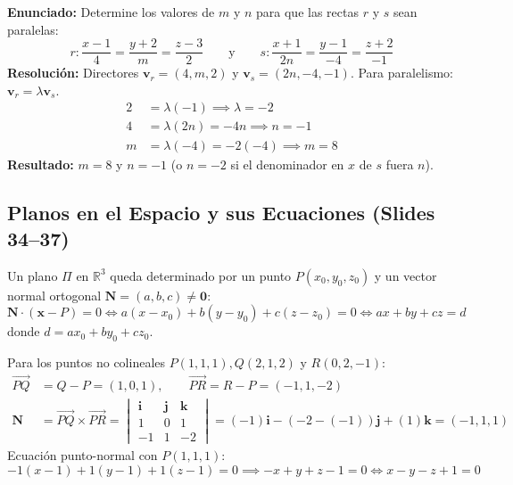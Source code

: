 \documentclass[10pt,letterpaper]{article}
\newcommand{\iu}{\mathbf{i}}
\newcommand{\ju}{\mathbf{j}}
\newcommand{\ku}{\mathbf{k}}
\newcommand{\vv}{\mathbf{v}}
\newcommand{\vn}{\mathbf{N}}
\begin{document}
\begin{cajaEjemplo}
\textbf{Enunciado:} Determine los valores de $m$ y $n$ para que las rectas $r$ y $s$ sean paralelas:
\[
r: \frac{x - 1}{4} = \frac{y + 2}{m} = \frac{z - 3}{2} \qquad \text{y} \qquad s: \frac{x + 1}{2n} = \frac{y - 1}{-4} = \frac{z + 2}{-1}
\]
\textbf{Resolución:} Directores $\vv_r = (4, m, 2)$ y $\vv_s = (2n, -4, -1)$.
Para paralelismo: $\vv_r = \lambda\vv_s$.
\begin{align*}
2 &= \lambda(-1) \implies \lambda = -2 \\
4 &= \lambda(2n) = -4n \implies n = -1 \\
m &= \lambda(-4) = -2(-4) \implies m = 8
\end{align*}
\textbf{Resultado:} $m = 8$ y $n = -1$ (o $n = -2$ si el denominador en $x$ de $s$ fuera $n$).
\end{cajaEjemplo}

\subsection{Planos en el Espacio y sus Ecuaciones (Slides 34--37)}
Un plano $\Pi$ en $\mathbb{R}^3$ queda determinado por un punto $P(x_0, y_0, z_0)$ y un vector normal ortogonal $\vn = (a, b, c) \neq \mathbf{0}$:
\[
\vn \cdot (\mathbf{x} - P) = 0 \iff a(x - x_0) + b(y - y_0) + c(z - z_0) = 0 \iff ax + by + cz = d
\]
donde $d = ax_0 + by_0 + cz_0$.

\begin{cajaEjemplo}
Para los puntos no colineales $P(1, 1, 1), Q(2, 1, 2)$ y $R(0, 2, -1)$:
\begin{align*}
\overrightarrow{PQ} &= Q - P = (1, 0, 1), \qquad \overrightarrow{PR} = R - P = (-1, 1, -2) \\
\vn &= \overrightarrow{PQ} \times \overrightarrow{PR} = \begin{vmatrix} \iu & \ju & \ku \\ 1 & 0 & 1 \\ -1 & 1 & -2 \end{vmatrix} = (-1)\iu - (-2 - (-1))\ju + (1)\ku = (-1, 1, 1)
\end{align*}
Ecuación punto-normal con $P(1, 1, 1)$:
\[
-1(x - 1) + 1(y - 1) + 1(z - 1) = 0 \implies -x + y + z - 1 = 0 \iff x - y - z + 1 = 0
\]
\end{cajaEjemplo}
\end{document}
